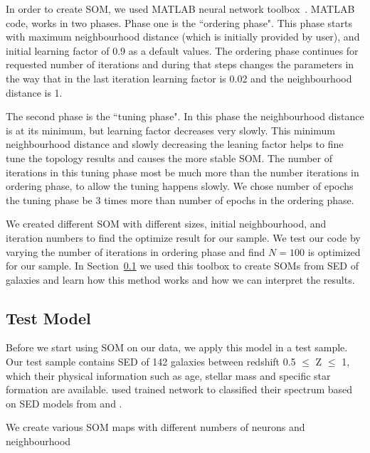      In order to create SOM, we used {\tiny MATLAB} neural network toolbox~\citep[ NEWSOM,][]{matlabtolbox}.
     {\tiny MATLAB} code, works in two phases. Phase one is the ``ordering phase". 
     This phase starts with maximum neighbourhood distance (which is initially provided by user), and initial learning factor of 0.9 as a default values. 
     The ordering phase continues for requested number of iterations and during that steps changes the parameters in the way that in the last iteration learning factor is 0.02 and the neighbourhood distance is 1.
     
     The second phase is the ``tuning phase".
     In this phase the neighbourhood distance is at its minimum, but learning factor decreases very slowly.
     This minimum neighbourhood distance and slowly decreasing the leaning factor helps to fine tune the topology results and causes the more stable SOM. 
     The number of iterations in this tuning phase most be much more than the number iterations in ordering phase, to allow the tuning happens slowly. 
     We chose number of epochs the tuning phase be 3 times more than number of epochs in the ordering phase.
    
     We created different SOM with different sizes, initial neighbourhood, and iteration numbers to find the optimize result for our sample.
     We test our code by varying the number of iterations in ordering phase and find $N = 100$  is optimized for our sample.
     In Section~\ref{sec: test model} we used this toolbox to create SOMs from SED of galaxies and learn how this method works and how we can interpret the results.
   
 \subsection{Test Model}
 \label{sec: test model}
    Before we start using SOM on our data, we apply this model in a test sample. 
    Our test sample contains SED of 142 galaxies between redshift 0.5 $ \leq$ Z $\leq $ 1, which their physical information such as age, stellar mass and specific star formation are available. 
    \cite{Hossein12} used trained network to classified their spectrum based on SED models from \cite{Kinney96} and \cite{Coleman80}.
    
    We create various SOM maps with different numbers of neurons and neighbourhood 
